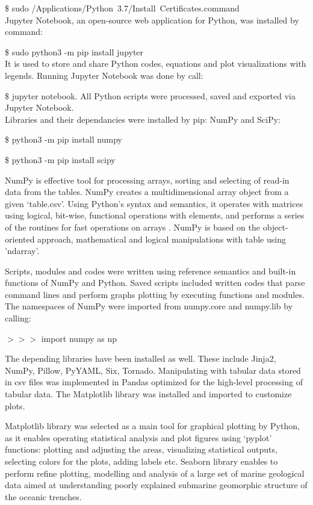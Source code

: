\documentclass[11pt,a4paper]{report}
\begin{document}
{\$ sudo /Applications/Python\ 3.7/Install\ Certificates.command \\
Jupyter Notebook, an open-source web application for Python, was installed by command: 

\$ sudo python3 -m pip install jupyter \\
It is used to store and share Python codes, equations and plot visualizations with legends. Running Jupyter Notebook was done by call: 

\$ jupyter notebook. All Python scripts were processed, saved and exported via Jupyter Notebook. \\
Libraries and their dependancies were installed by pip: \ac{NumPy} and \ac{SciPy}: 

\$ python3 -m pip install numpy

\$ python3 -m pip install scipy
 
\ac{NumPy} is effective tool for processing arrays, sorting and selecting of read-in data from the tables. \ac{NumPy} creates a multidimensional array object from a given ‘table.csv’. Using Python’s syntax and semantics, it operates with matrices using logical, bit-wise, functional operations with elements, and performs a series of the routines for fast operations on arrays \cite{NumPyCommunity2019}. \ac{NumPy} is based on the object-oriented approach, mathematical and logical manipulations with table using 'ndarray'. 

Scripts, modules and codes were written using reference semantics and built-in functions of \ac{NumPy} and Python. Saved scripts included written codes that parse command lines and perform graphs plotting by executing functions and modules. The namespaces of NumPy were imported from numpy.core and numpy.lib by calling:

$>>>$ import numpy as np

The depending libraries have been installed as well. These include Jinja2, \ac{NumPy}, Pillow, PyYAML, Six, Tornado. Manipulating with tabular data stored in csv files was implemented in Pandas optimized for the high-level processing of tabular data. The Matplotlib library was installed and imported to customize plots. 

Matplotlib library was selected as a main tool for graphical plotting by Python, as it enables operating statistical analysis and plot figures using ‘pyplot’ functions: plotting and adjusting the areas, visualizing statistical outputs, selecting colors for the plots, adding labels etc. Seaborn library enables to perform refine plotting, modelling and analysis of a large set of marine geological data aimed at understanding poorly explained submarine geomorphic structure of the oceanic trenches. 

}
\end{document}
